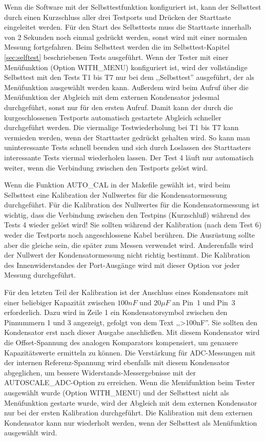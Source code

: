 Wenn die Software mit der Selbsttestfunktion konfiguriert ist, kann der Selbsttest durch einen Kurzschluss aller drei
Testports und Drücken der Starttaste eingeleitet werden.
Für den Start des Selbsttests muss die Starttaste innerhalb von 2 Sekunden noch einmal gedrückt werden,
sonst wird mit einer normalen Messung fortgefahren.
Beim Selbsttest werden die im Selbsttest-Kapitel \ref{sec:selftest} beschriebenen Tests ausgeführt.
Wenn der Tester mit einer Menüfunktion (Option WITH\_MENU) konfiguriert ist, 
wird der vollständige Selbsttest mit den Tests T1 bis T7 nur bei dem ,,Selbsttest'' ausgeführt, 
der als Menüfunktion ausgewählt werden kann.
Außerdem wird beim Aufruf über die Menüfunktion der Abgleich mit dem externen Kondensator jedesmal durchgeführt,
sonst nur für den ersten Aufruf.
Damit kann der durch die kurgeschlossenen Testports automatisch gestartete Abgleich schneller durchgeführt werden. 
Die viermalige Testwiederholung bei T1 bis T7 kann vermieden werden, wenn der Starttaster gedrückt gehalten wird.
So kann man uninteressante Tests schnell beenden und
sich durch Loslassen des Starttasters interessante Tests viermal wiederholen lassen.
Der Test 4 läuft nur automatisch weiter, wenn die Verbindung zwischen den Testports gelöst wird.

Wenn die Funktion AUTO\_CAL in der Makefile gewählt ist, wird beim Selbsttest
eine Kalibration der Nullwertes für die Kondensatormessung durchgeführt.
Für die Kalibration des Nullwertes für die Kondensatormessung ist wichtig, 
dass die Verbindung zwischen den Testpins (Kurzschluß) während des Tests 4 wieder gelöst wird!
Sie sollten während der Kalibration (nach dem Test 6) weder die Testports noch angeschlossene Kabel berühren.
Die Ausrüstung sollte aber die gleiche sein, die später zum Messen verwendet wird.
Anderenfalls wird der Nullwert der Kondensatormessung nicht richtig bestimmt.
Die Kalibration des Innenwiderstandes der Port-Ausgänge wird mit dieser Option vor jeder
Messung durchgeführt.

Für den letzten Teil der Kalibration ist der Anschluss eines Kondensators 
mit einer beliebiger Kapazität zwischen \(100 nF\) und \(20 \mu F\) an Pin~1 und Pin~3 erforderlich.
Dazu wird in Zeile 1 ein Kondensatorsymbol zwischen den Pinnummern 1 und 3 angezeigt, gefolgt von dem Text ,,\textgreater100nF''.
Sie sollten den Kondensator erst nach dieser Ausgabe anschließen.
Mit diesem Kondensator wird die Offset-Spannung des analogen Komparators kompensiert,
um genauere Kapazitätswerte ermitteln zu können.
Die Verstärkung für ADC-Messungen mit der internen Referenz-Spannung wird ebenfalls mit diesem Kondensator abgeglichen, um
bessere Widerstands-Messergebnisse mit der AUTOSCALE\_ADC-Option zu erreichen.
Wenn die Menüfunktion beim Tester ausgewählt wurde (Option WITH\_MENU) und der Selbsttest
nicht als Menüfunktion gestarte wurde, wird der Abgleich mit dem externen Kondensator nur bei
der ersten Kalibration durchgeführt.
Die Kalibration mit dem externen Kondensator kann nur wiederholt werden, wenn der Selbsttest
als Menüfunktion ausgewählt wird.

